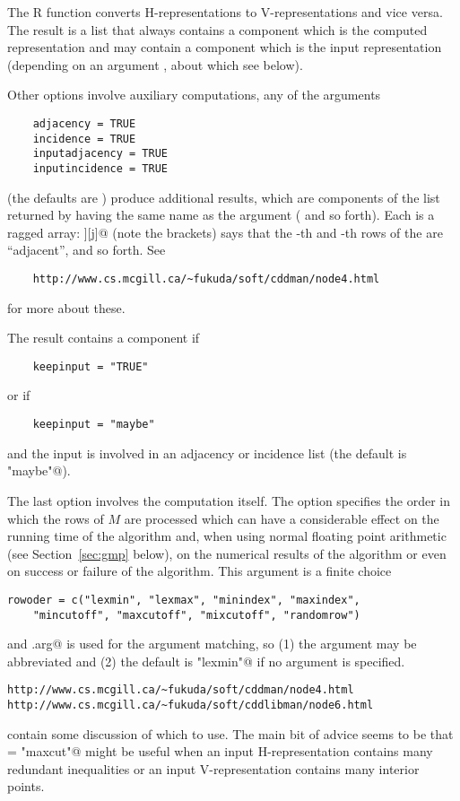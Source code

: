 \documentclass{article}
\begin{document}
The R function \verb@scdd@ converts H-representations to V-representations
and vice versa.
The result is a list that
always contains a component \verb@output@ which is the
computed representation and may contain a component \verb@input@ which is
the input representation (depending on an argument \verb@keepinput@,
about which see below).

Other options involve auxiliary computations, any of the arguments
\begin{verbatim}
    adjacency = TRUE
    incidence = TRUE
    inputadjacency = TRUE
    inputincidence = TRUE
\end{verbatim}
(the defaults are \verb@FALSE@)
produce additional results, which are components of the list returned
by \verb@scdd@ having the same name as the argument (\verb@adjacency@
and so forth).  Each is a ragged array: \verb@adjacency[[i]][j]@
(note the brackets) says that the \verb@i@-th and \verb@j@-th rows
of the \verb@output@ are ``adjacent'', and so forth.  See
\begin{verbatim}
    http://www.cs.mcgill.ca/~fukuda/soft/cddman/node4.html
\end{verbatim}
for more about these.

The result contains a component \verb@input@ if
\begin{verbatim}
    keepinput = "TRUE"
\end{verbatim}
or if
\begin{verbatim}
    keepinput = "maybe"
\end{verbatim}
and the input is involved in an adjacency or incidence list
(the default is \verb@"maybe"@).

The last option involves the computation itself.
The \verb@roworder@ option specifies the order in which the rows of $M$
are processed which can have a considerable effect on the running time
of the algorithm and, when using normal floating point arithmetic
(see Section~\ref{sec:gmp} below), on the numerical results of the
algorithm or even on success or failure of the algorithm.  This argument
is a finite choice
\begin{verbatim}
rowoder = c("lexmin", "lexmax", "minindex", "maxindex",
    "mincutoff", "maxcutoff", "mixcutoff", "randomrow")
\end{verbatim}
and \verb@match.arg@ is used for the argument matching, so
(1) the argument may be abbreviated and (2) the default is \verb@"lexmin"@
if no argument is specified.
\begin{verbatim}
http://www.cs.mcgill.ca/~fukuda/soft/cddman/node4.html
http://www.cs.mcgill.ca/~fukuda/soft/cddlibman/node6.html
\end{verbatim}
contain some discussion of which to use.  The main bit of advice seems
to be that \verb@roworder = "maxcut"@ might be useful when an input
H-representation contains many redundant inequalities or an input
V-representation contains many interior points.
\end{document}
